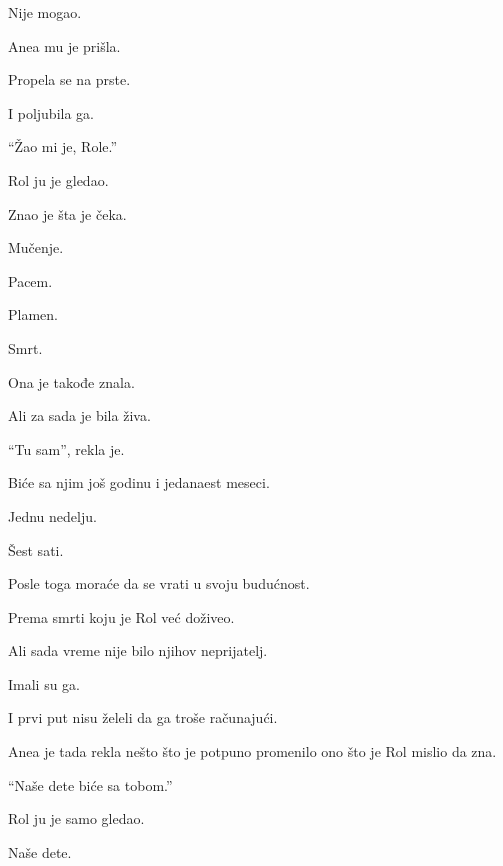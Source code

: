 Nije mogao.

\bigskip

Anea mu je prišla.

Propela se na prste.

\bigskip

I poljubila ga.

\bigskip

``Žao mi je, Role.''

\bigskip

Rol ju je gledao.

\bigskip

Znao je šta je čeka.

\bigskip

Mučenje.

Pacem.

Plamen.

Smrt.

\bigskip

Ona je takođe znala.

\bigskip

Ali za sada je bila živa.

\bigskip

``Tu sam'', rekla je.

\bigskip

Biće sa njim još godinu i jedanaest meseci.

Jednu nedelju.

Šest sati.

\bigskip

Posle toga moraće da se vrati u svoju budućnost.

\bigskip

Prema smrti koju je Rol već doživeo.

\bigskip

Ali sada vreme nije bilo njihov neprijatelj.

\bigskip

Imali su ga.

\bigskip

I prvi put nisu želeli da ga troše računajući.

\bigskip

Anea je tada rekla nešto što je potpuno promenilo ono što je Rol mislio da zna.

\bigskip

``Naše dete biće sa tobom.''

\bigskip

Rol ju je samo gledao.

\bigskip

Naše dete.

